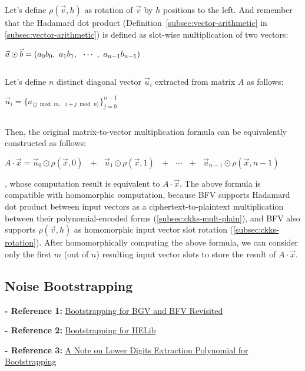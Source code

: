 $ $

Let's define $\rho(\vec{v}, h)$ as rotation of $\vec{v}$ by $h$ positions to the left. And remember that the Hadamard dot product (Definition~\ref*{subsec:vector-arithmetic} in \autoref{subsec:vector-arithmetic}) is defined as slot-wise multiplication of two vectors: 

$\vec{a} \odot \vec{b} = (a_0 b_0, \text{ } a_1 b_1, \text{ } \text{ } \text{$\cdots$} \text{ }, \text{ } a_{n-1} b_{n-1})$

$ $

Let's define $n$ distinct diagonal vector $\vec{u}_i$ extracted from matrix $A$ as follows: 

$\vec{u}_i = \{a_{\langle j \bmod m, \text{ } i + j\bmod n \rangle}\}_{j = 0}^{n-1}$

$ $

Then, the original matrix-to-vector multiplication formula can be equivalently constructed as follows:

$A \cdot \vec{x} = \vec{u}_0 \odot \rho(\vec{x}, 0) \text{ } + \text{ } \vec{u}_1 \odot \rho(\vec{x}, 1) \text{ } + \text{ } \cdots \text{ } + \text{ } \vec{u}_{n-1} \odot \rho(\vec{x}, n-1)$

, whose computation result is equivalent to $A \cdot \vec{x}$. 
The above formula is compatible with homomorphic computation, because BFV supports Hadamard dot product between input vectors as a ciphertext-to-plaintext multiplication between their polynomial-encoded forms (\autoref{subsec:ckks-mult-plain}), and BFV also supports $\rho(\vec{v}, h)$ as homomorphic input vector slot rotation (\autoref{subsec:ckks-rotation}). After homomorphically computing the above formula, we can consider only the first $m$ (out of $n$) resulting input vector slots to store the result of $A \cdot \vec{x}$. 



\subsection{Noise Bootstrapping}
\label{subsec:bfv-bootstrapping}

\noindent \textbf{- Reference 1:} 
\href{https://eprint.iacr.org/2022/1363.pdf}{Bootstrapping for BGV and BFV Revisited}~\cite{cryptoeprint:2022/1363}


\noindent \textbf{- Reference 2:} 
\href{https://eprint.iacr.org/2014/873.pdf}{Bootstrapping for HELib}~\cite{10.1007/s00145-020-09368-7}

\noindent \textbf{- Reference 3:} 
\href{https://arxiv.org/pdf/1906.02867}{A Note on Lower Digits Extraction Polynomial for Bootstrapping}~\cite{huo2019notelowerdigitsextraction}

